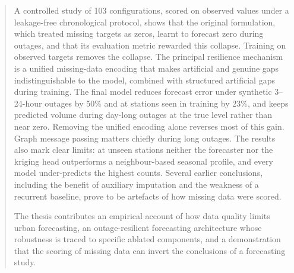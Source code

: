 \begin{abstract}
A controlled study of 103 configurations, scored on observed values
under a leakage-free chronological protocol, shows that the original
formulation, which treated missing targets as zeros, learnt to forecast
zero during outages, and that its evaluation metric rewarded this
collapse. Training on observed targets removes the collapse. The
principal resilience mechanism is a unified missing-data encoding that
makes artificial and genuine gaps indistinguishable to the model,
combined with structured artificial gaps during training. The final
model reduces forecast error under synthetic 3--24-hour outages by
50\% and at stations seen in training by 23\%, and keeps predicted
volume during day-long outages at the true level rather than near zero.
Removing the unified encoding alone reverses most of this gain. Graph
message passing matters chiefly during long outages. The results also
mark clear limits: at unseen stations neither the forecaster nor the
kriging head outperforms a neighbour-based seasonal profile, and every
model under-predicts the highest counts. Several earlier conclusions,
including the benefit of auxiliary imputation and the weakness of a
recurrent baseline, prove to be artefacts of how missing data were
scored.

The thesis contributes an empirical account of how data quality limits
urban forecasting, an outage-resilient forecasting architecture whose
robustness is traced to specific ablated components, and a
demonstration that the scoring of missing data can invert the
conclusions of a forecasting study.
\end{abstract}
